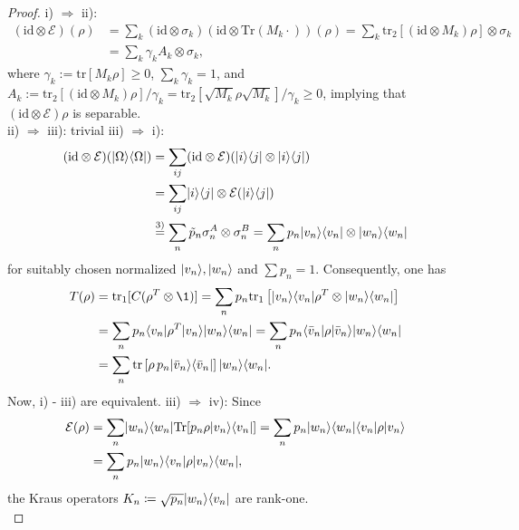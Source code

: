 \begin{proof}
i) $\Rightarrow$ ii):
\begin{align*}
    (\text{id} \otimes \mathcal{E})(\rho) &= \sum_k (\text{id} \otimes \sigma_k) ( \text{id} \otimes \text{Tr}(M_k \cdot) ) (\rho) = \sum_k \text{tr}_2 \left[ (\text{id} \otimes M_k) \rho \right] \otimes \sigma_k \\
    &= \sum_k \gamma_k A_k \otimes \sigma_k,
\end{align*}
where $\gamma_k := \text{tr}[M_k \rho] \geq 0$, $\sum_k \gamma_k = 1$, and $A_k := \text{tr}_2 \left[ (\text{id} \otimes M_k) \rho \right] / \gamma_k  = \text{tr}_2[\sqrt{M_k} \rho \sqrt{M_k}]/\gamma_k\geq 0$,
implying that $(\text{id} \otimes \mathcal{E})\rho$ is separable.\\
ii) $\Rightarrow$ iii): trivial
iii) $\Rightarrow$ i):
\begin{align*}
    (\text{id} \otimes \mathcal{E})(\lvert\Omega\rangle\langle\Omega\rvert) &= \sum_{ij} (\text{id} \otimes \mathcal{E})(\lvert i\rangle\langle j\rvert \otimes \lvert i\rangle\langle j\rvert) \\
    &= \sum_{ij} \lvert i\rangle\langle j\rvert \otimes \mathcal{E}(\lvert i\rangle\langle j\rvert) \\
    &\overset{3)}{=} \sum_n \tilde{p}_n \sigma_n^A \otimes \sigma_n^B = \sum_n p_n \lvert v_n\rangle\langle v_n\rvert \otimes \lvert w_n\rangle\langle w_n\rvert
\end{align*}
for suitably chosen normalized $\lvert v_n\rangle, \lvert w_n\rangle$ and $\sum p_n = 1$. Consequently, one has
\begin{align*}
    T(\rho) &= \text{tr}_1[C (\rho^T \otimes \1)] = \sum_n p_n \text{tr}_1 \left[ \ket{v_n}\bra{v_n} \rho^T \otimes \ket{w_n}\bra{w_n} \right] \\
    &= \sum_n p_n \bra{v_n} \rho^T \ket{v_n} \ket{w_n}\bra{w_n} = \sum_n p_n \bra{\bar{v}_n} \rho \ket{\bar{v}_n} \ket{w_n}\bra{w_n} \\
    &= \sum_n \text{tr} \left[ \rho \, p_n \ket{\bar{v}_n}\bra{\bar{v}_n} \right] \ket{w_n}\bra{w_n}.
\end{align*}
Now, i) - iii) are equivalent. iii) $\Rightarrow$ iv): Since
\begin{align*}
    \mathcal{E}(\rho) &= \sum_n \lvert w_n\rangle\langle w_n\rvert \text{Tr}[p_n \rho \lvert v_n\rangle\langle v_n\rvert] = \sum_n p_n \lvert w_n\rangle\langle w_n\rvert \langle v_n\rvert \rho \lvert v_n\rangle \\
    &= \sum_n p_n \lvert w_n\rangle\langle v_n\rvert\rho \lvert v_n\rangle\langle w_n\rvert,
\end{align*}
the Kraus operators $K_n \coloneqq \sqrt{p_n}\lvert w_n\rangle\langle v_n\rvert$ are rank-one.\\

\end{proof}
